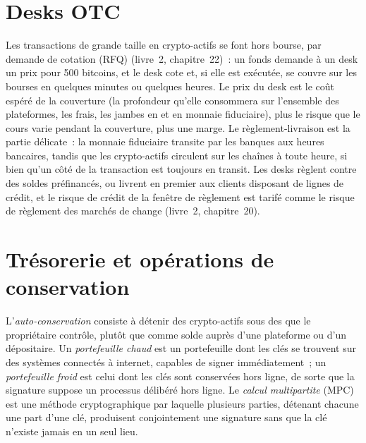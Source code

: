 \section{Desks OTC}

Les transactions de grande taille en crypto-actifs se font hors bourse, par demande de cotation (RFQ) (livre~2, chapitre~22)~: un fonds demande à un desk un prix pour 500 bitcoins, et le desk
cote et, si elle est exécutée, se couvre sur les bourses en quelques minutes ou quelques heures. Le prix du desk est le coût espéré de la couverture (la profondeur qu'elle consommera sur l'ensemble des plateformes, les frais,
les jambes en  et en monnaie fiduciaire), plus le risque que le cours varie pendant la couverture, plus une marge. Le règlement-livraison est la partie délicate~: la monnaie fiduciaire transite par les banques
aux heures bancaires, tandis que les crypto-actifs circulent sur les chaînes à toute heure, si bien qu'un côté de la transaction est toujours en transit. Les desks règlent contre des soldes préfinancés, ou livrent en premier
aux clients disposant de lignes de crédit, et le risque de crédit de la fenêtre de règlement est tarifé comme le risque de règlement des marchés de change (livre~2, chapitre~20).

\section{Trésorerie et opérations de conservation}

\begin{definition}\label{def:m3:the-crypto-trading-business:custody}
L'\emph{auto-conservation} consiste à détenir des crypto-actifs sous des  que le propriétaire contrôle, plutôt que comme solde auprès d'une plateforme ou d'un dépositaire. Un
\emph{portefeuille chaud} est un portefeuille dont les clés se trouvent sur des systèmes connectés à internet, capables de signer immédiatement~; un \emph{portefeuille froid} est celui
dont les clés sont conservées hors ligne, de sorte que la signature suppose un processus délibéré hors ligne. Le \emph{calcul multipartite} (MPC) est une
méthode cryptographique par laquelle plusieurs parties, détenant chacune une part d'une clé, produisent conjointement une signature sans que la clé n'existe jamais en un seul lieu.
\end{definition}

